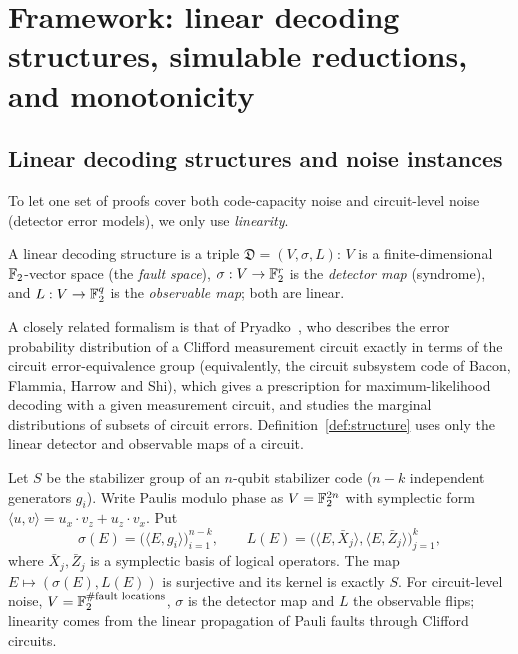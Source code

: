 \section{Framework: linear decoding structures, simulable reductions, and monotonicity}\label{sec:framework}

\subsection{Linear decoding structures and noise instances}

To let one set of proofs cover both code-capacity noise and circuit-level noise (detector error models), we only use \emph{linearity}.

\begin{definition}\label{def:structure}
A linear decoding structure is a triple $\mathfrak D=(V,\sigma,L)$: $V$ is a finite-dimensional $\mathbb{F}_2$-vector space (the \emph{fault space}),
$\sigma:V\to\mathbb{F}_2^{r}$ is the \emph{detector map} (syndrome), and $L:V\to\mathbb{F}_2^{q}$ is the \emph{observable map}; both are linear.
\end{definition}
\noindent A closely related formalism is that of Pryadko~\cite{Pryadko}, who describes the error probability distribution of a Clifford measurement circuit exactly in terms of the circuit error-equivalence group (equivalently, the circuit subsystem code of Bacon, Flammia, Harrow and Shi), which gives a prescription for maximum-likelihood decoding with a given measurement circuit, and studies the marginal distributions of subsets of circuit errors. Definition~\ref{def:structure} uses only the linear detector and observable maps of a circuit.

\begin{definition}\label{def:code-structure}
Let $S$ be the stabilizer group of an $n$-qubit stabilizer code ($n-k$ independent generators $g_i$). Write Paulis modulo phase as $V=\mathbb{F}_2^{2n}$ with
symplectic form $\langle u,v\rangle=u_x\!\cdot v_z+u_z\!\cdot v_x$. Put
\[
\sigma(E)=\big(\langle E,g_i\rangle\big)_{i=1}^{n-k},\qquad
L(E)=\big(\langle E,\bar X_j\rangle,\langle E,\bar Z_j\rangle\big)_{j=1}^{k},
\]
where $\bar X_j,\bar Z_j$ is a symplectic basis of logical operators. The map $E\mapsto(\sigma(E),L(E))$ is surjective and its kernel is exactly $S$.
For circuit-level noise, $V=\mathbb{F}_2^{\#\text{fault locations}}$, $\sigma$ is the detector map and $L$ the observable flips; linearity comes from
the linear propagation of Pauli faults through Clifford circuits.
\end{definition}

